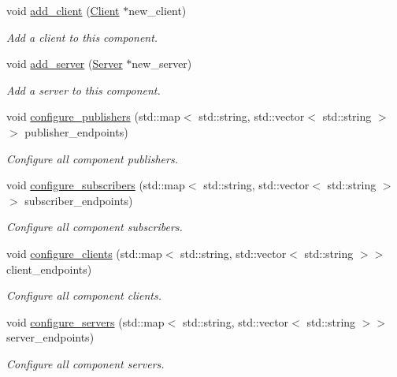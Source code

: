 \begin{DoxyCompactItemize}
void \hyperlink{classzcm_1_1Component_ad71bf4cebc218089642d16f697a493fa}{add\-\_\-client} (\hyperlink{classzcm_1_1Client}{Client} $\ast$new\-\_\-client)
\begin{DoxyCompactList}\small\item\em Add a client to this component. \end{DoxyCompactList}\item 
void \hyperlink{classzcm_1_1Component_a31989e75d9de6093cb712148cd94da71}{add\-\_\-server} (\hyperlink{classzcm_1_1Server}{Server} $\ast$new\-\_\-server)
\begin{DoxyCompactList}\small\item\em Add a server to this component. \end{DoxyCompactList}\item 
void \hyperlink{classzcm_1_1Component_a64674700fb1edd7c84a64ce78aa5b2f4}{configure\-\_\-publishers} (std\-::map$<$ std\-::string, std\-::vector$<$ std\-::string $>$$>$ publisher\-\_\-endpoints)
\begin{DoxyCompactList}\small\item\em Configure all component publishers. \end{DoxyCompactList}\item 
void \hyperlink{classzcm_1_1Component_a25c31193982bb317186f4f3b4d8d790c}{configure\-\_\-subscribers} (std\-::map$<$ std\-::string, std\-::vector$<$ std\-::string $>$$>$ subscriber\-\_\-endpoints)
\begin{DoxyCompactList}\small\item\em Configure all component subscribers. \end{DoxyCompactList}\item 
void \hyperlink{classzcm_1_1Component_ad3ed49fb7e936de3fd66ac4e37974735}{configure\-\_\-clients} (std\-::map$<$ std\-::string, std\-::vector$<$ std\-::string $>$$>$ client\-\_\-endpoints)
\begin{DoxyCompactList}\small\item\em Configure all component clients. \end{DoxyCompactList}\item 
void \hyperlink{classzcm_1_1Component_a9a8df5c1a899ec4470dd5bbcd90e9e79}{configure\-\_\-servers} (std\-::map$<$ std\-::string, std\-::vector$<$ std\-::string $>$$>$ server\-\_\-endpoints)
\begin{DoxyCompactList}\small\item\em Configure all component servers. \end{DoxyCompactList}\item 

\end{DoxyCompactItemize}
